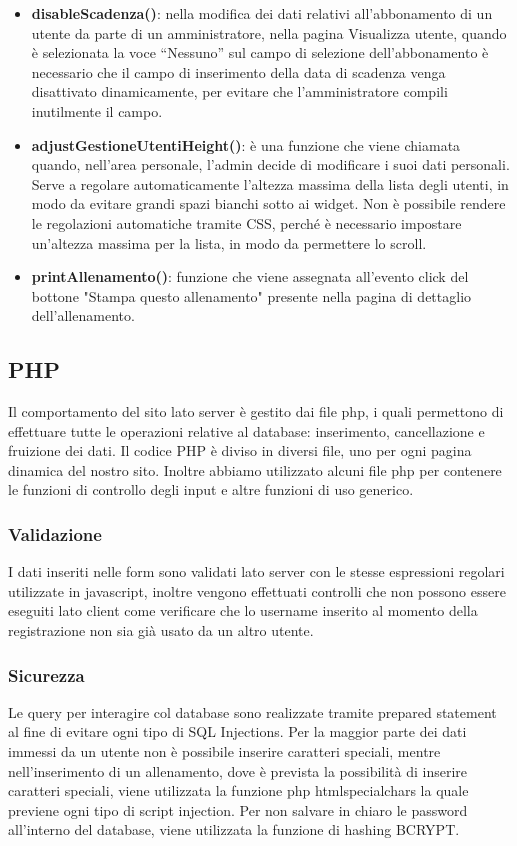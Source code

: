 \documentclass[a4paper]{article}
\begin{document}
\begin{itemize}
		\item \textbf{disableScadenza()}: nella modifica dei dati relativi all'abbonamento di un utente da parte di un amministratore, nella pagina Visualizza utente, quando è selezionata la voce “Nessuno” sul campo di selezione dell'abbonamento è necessario che il campo di inserimento della data di scadenza venga disattivato dinamicamente, per evitare che l'amministratore compili inutilmente il campo.
		\item \textbf{adjustGestioneUtentiHeight()}: è una funzione che viene chiamata quando, nell'area personale, l'admin decide di modificare i suoi dati personali. Serve a regolare automaticamente l'altezza massima della lista degli utenti, in modo da evitare grandi spazi bianchi sotto ai widget. Non è possibile rendere le regolazioni automatiche tramite CSS, perché è necessario impostare un'altezza massima per la lista, in modo da permettere lo scroll.
		\item \textbf{printAllenamento()}: funzione che viene assegnata all'evento click del bottone "Stampa questo allenamento" presente nella pagina di dettaglio dell'allenamento.
	\end{itemize}
	
	\subsection{PHP}
	Il comportamento del sito lato server è gestito dai file php, i quali permettono di effettuare tutte le operazioni relative al database: inserimento, cancellazione e fruizione dei dati. Il codice PHP è diviso in diversi file, uno per ogni pagina dinamica del nostro sito. Inoltre abbiamo utilizzato alcuni file php per contenere le funzioni di controllo degli input e altre funzioni di uso generico.
	\subsubsection{Validazione}
	I dati inseriti nelle form sono validati lato server con le stesse espressioni regolari utilizzate in javascript, inoltre vengono effettuati controlli che non possono essere eseguiti lato client come verificare che lo username inserito al momento della registrazione non sia già usato da un altro utente.
	\subsubsection{Sicurezza}
	Le query per interagire col database sono realizzate tramite prepared statement al fine di evitare ogni tipo di SQL Injections. Per la maggior parte dei dati immessi da un utente non è possibile inserire caratteri speciali, mentre nell'inserimento di un allenamento, dove è prevista la possibilità di inserire caratteri speciali, viene utilizzata la funzione php htmlspecialchars la quale previene ogni tipo di script injection. Per non salvare in chiaro le password all'interno del database, viene utilizzata la funzione di hashing BCRYPT.
\end{document}
